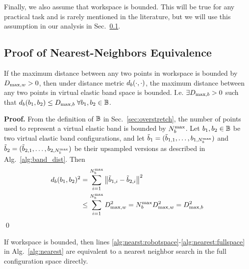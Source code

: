 Finally, we also assume that workspace is bounded. This will be true for any practical task and is rarely mentioned in the literature, but we will use this assumption in our analysis in Sec.~\ref{sec:nn_equiv}.




\subsection{Proof of Nearest-Neighbors Equivalence}
\label{sec:nn_equiv}


\begin{lemma}
    \label{lem:banddist}
     If the maximum distance between any two points in workspace is bounded by $D_{\textrm{max}, w} > 0$, then under distance metric $d_b(\cdot, \cdot)$, the maximum distance between any two points in virtual elastic band space is bounded. I.e. $\exists D_{\textrm{max},b} > 0$ such that $d_b(b_1, b_2) \leq D_{\textrm{max},b} \; \forall b_1, b_2 \in \mathbb{B}$.
\end{lemma}


\noindent
{\bf Proof.}
From the definition of $\mathbb{B}$ in Sec.~\ref{sec:overstretch}, the number of points used to represent a virtual elastic band is bounded by $N_b^\textrm{max}$. Let $b_1, b_2 \in \mathbb{B}$ be two virtual elastic band configurations, and let $\tilde {b}_1 = (\tilde b_{1,1}, \dots, b_{1,N_b^\textrm{max}})$ and $\tilde {b}_2 = (\tilde b_{2,1}, \dots, b_{2,N_b^\textrm{max}})$ be their upsampled versions as described in Alg.~\ref{alg:band_dist}. Then
\begin{equation}
\begin{split}
    d_b(b_1, b_2)^2 &= \sum_{i=1}^{N_b^\textrm{max}} \left\| \tilde b_{1,i} - \tilde b_{2,i} \right\|^2 \\
                                &\leq \sum_{i=1}^{N_b^\textrm{max}} D_{\textrm{max}, w}^2 = N_b^\textrm{max} D_{\textrm{max}, w}^2 = D_{\textrm{max},b}^2
\end{split}
\end{equation}
\qed




\begin{lemma}
    If workspace is bounded, then lines \ref{alg:nearst:robotspace}-\ref{alg:nearest:fullspace} in Alg.~\ref{alg:nearest} are equivalent to a nearest neighbor search in the full configuration space directly.
\end{lemma}


